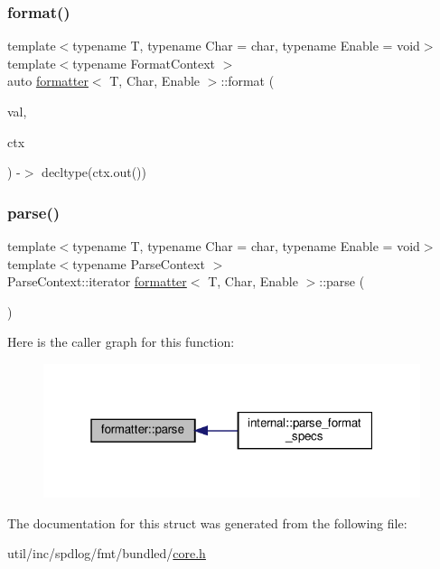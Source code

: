 \subsubsection{\texorpdfstring{format()}{format()}}
{\footnotesize\ttfamily template$<$typename T, typename Char = char, typename Enable = void$>$ \\
template$<$typename Format\+Context $>$ \\
auto \hyperlink{structformatter}{formatter}$<$ T, Char, Enable $>$\+::format (\begin{DoxyParamCaption}\item[{const T \&}]{val,  }\item[{Format\+Context \&}]{ctx }\end{DoxyParamCaption}) -\/$>$  decltype(ctx.\+out())}

\mbox{\label{structformatter_ab38951e604996ba856509a99ddb5c50a}} 
\subsubsection{\texorpdfstring{parse()}{parse()}}
{\footnotesize\ttfamily template$<$typename T, typename Char = char, typename Enable = void$>$ \\
template$<$typename Parse\+Context $>$ \\
Parse\+Context\+::iterator \hyperlink{structformatter}{formatter}$<$ T, Char, Enable $>$\+::parse (\begin{DoxyParamCaption}\item[{Parse\+Context \&}]{ }\end{DoxyParamCaption})}

Here is the caller graph for this function\+:
\nopagebreak
\begin{figure}[H]
\begin{center}
\leavevmode
\includegraphics[width=313pt]{structformatter_ab38951e604996ba856509a99ddb5c50a_icgraph}
\end{center}
\end{figure}


The documentation for this struct was generated from the following file\+:\begin{DoxyCompactItemize}
\item 
util/inc/spdlog/fmt/bundled/\hyperlink{core_8h}{core.\+h}\end{DoxyCompactItemize}
